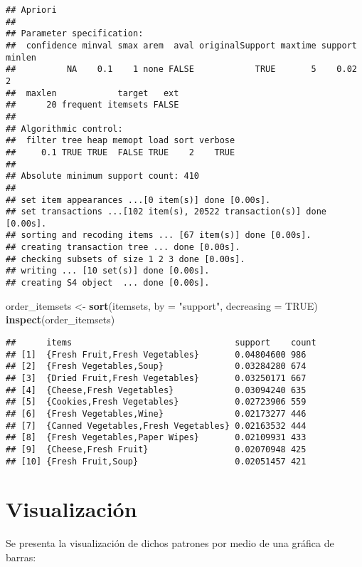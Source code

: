 \documentclass[]{article}
\newenvironment{Shaded}{\begin{snugshade}}{\end{snugshade}}
\newcommand{\KeywordTok}[1]{\textcolor[rgb]{0.13,0.29,0.53}{\textbf{#1}}}
\newcommand{\DataTypeTok}[1]{\textcolor[rgb]{0.13,0.29,0.53}{#1}}
\newcommand{\StringTok}[1]{\textcolor[rgb]{0.31,0.60,0.02}{#1}}
\newcommand{\OtherTok}[1]{\textcolor[rgb]{0.56,0.35,0.01}{#1}}
\newcommand{\NormalTok}[1]{#1}
\begin{document}
\begin{verbatim}
## Apriori
## 
## Parameter specification:
##  confidence minval smax arem  aval originalSupport maxtime support minlen
##          NA    0.1    1 none FALSE            TRUE       5    0.02      2
##  maxlen            target   ext
##      20 frequent itemsets FALSE
## 
## Algorithmic control:
##  filter tree heap memopt load sort verbose
##     0.1 TRUE TRUE  FALSE TRUE    2    TRUE
## 
## Absolute minimum support count: 410 
## 
## set item appearances ...[0 item(s)] done [0.00s].
## set transactions ...[102 item(s), 20522 transaction(s)] done [0.00s].
## sorting and recoding items ... [67 item(s)] done [0.00s].
## creating transaction tree ... done [0.00s].
## checking subsets of size 1 2 3 done [0.00s].
## writing ... [10 set(s)] done [0.00s].
## creating S4 object  ... done [0.00s].
\end{verbatim}

\begin{Shaded}
\begin{Highlighting}[]
\NormalTok{order_itemsets <-}\StringTok{ }\KeywordTok{sort}\NormalTok{(itemsets, }\DataTypeTok{by =} \StringTok{"support"}\NormalTok{, }\DataTypeTok{decreasing =} \OtherTok{TRUE}\NormalTok{)}
\KeywordTok{inspect}\NormalTok{(order_itemsets)}
\end{Highlighting}
\end{Shaded}

\begin{verbatim}
##      items                                support    count
## [1]  {Fresh Fruit,Fresh Vegetables}       0.04804600 986  
## [2]  {Fresh Vegetables,Soup}              0.03284280 674  
## [3]  {Dried Fruit,Fresh Vegetables}       0.03250171 667  
## [4]  {Cheese,Fresh Vegetables}            0.03094240 635  
## [5]  {Cookies,Fresh Vegetables}           0.02723906 559  
## [6]  {Fresh Vegetables,Wine}              0.02173277 446  
## [7]  {Canned Vegetables,Fresh Vegetables} 0.02163532 444  
## [8]  {Fresh Vegetables,Paper Wipes}       0.02109931 433  
## [9]  {Cheese,Fresh Fruit}                 0.02070948 425  
## [10] {Fresh Fruit,Soup}                   0.02051457 421
\end{verbatim}

\section{Visualización}\label{visualizacion}

Se presenta la visualización de dichos patrones por medio de una gráfica
de barras:
\end{document}
